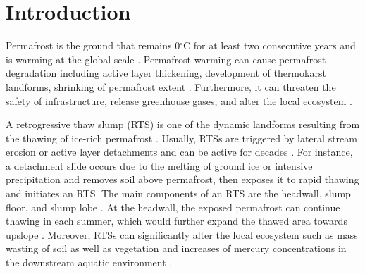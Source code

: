 \documentclass[authoryear,preprint,review,12pt]{elsarticle}
\begin{document}

\section{Introduction}
\label{sec_intro}

Permafrost is the ground that remains 0$^\circ$C for at least two consecutive years and is warming at the global scale \citep{biskaborn2019permafrost}. 
Permafrost warming can cause permafrost degradation including active layer thickening, development of thermokarst landforms, shrinking of permafrost extent \citep{czudek_thermokarst_1970,jorgenson_response_2005,osterkamp2007Characteristics,aakerman2008thawing,zhao2010Thermal}. 
Furthermore, it can threaten the safety of infrastructure, release greenhouse gases, and alter the local ecosystem \citep{tong_effect_1996,yang2010permafrost,bowden2010climate,grosse_vulnerability_2011,vonk2015reviews,schuur_climate_2015,olefeldt_circumpolar_2016,schuster2018permafrost,hjort2018degrading}.


A retrogressive thaw slump (RTS) is one of the dynamic landforms resulting from the thawing of ice-rich permafrost \citep{czudek_thermokarst_1970, jorgenson_thermokarst_2013,farquharson2016spatial,jones2019rapid}. 
Usually, RTSs are triggered by lateral stream erosion or active layer detachments \citep{french2017periglacial} and can be active for decades \citep{burn1989geomorphology, lacelle2010climatic, swanson2018growth}. 
For instance, a detachment slide occurs due to the melting of ground ice or intensive precipitation and removes soil above permafrost, then exposes it to rapid thawing and initiates an RTS. 
The main components of an RTS are the headwall, slump floor, and slump lobe \citep{lantuit_fifty_2008}. 
At the headwall, the exposed permafrost can continue thawing in each summer, which would further expand the thawed area towards upslope \citep{french2017periglacial}. 
Moreover, RTSs can significantly alter the local ecosystem such as mass wasting of soil as well as vegetation \citep{gooseff2009effects} and increases of mercury concentrations in the downstream aquatic environment \citep{pierre2018unprecedented}.
\end{document}
